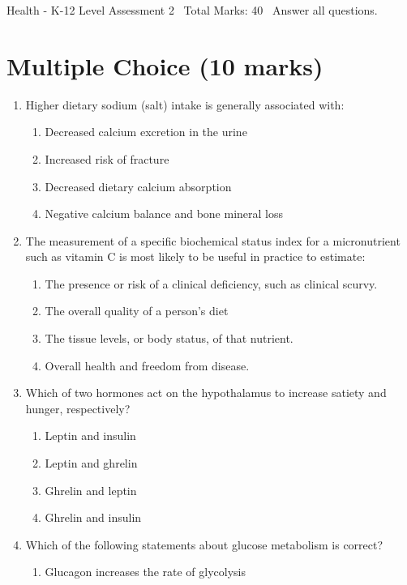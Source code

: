 \documentclass[12pt]{article}
\begin{document}
\begin{center}
Health - K-12 Level Assessment 2 \
Total Marks: 40 \
Answer all questions.
\end{center}

\section*{Multiple Choice (10 marks)}
\begin{enumerate}[label=\arabic*.]
\item Higher dietary sodium (salt) intake is generally associated with:
\begin{enumerate}[label=(\alph*)]
    \item Decreased calcium excretion in the urine
    \item Increased risk of fracture
    \item Decreased dietary calcium absorption
    \item Negative calcium balance and bone mineral loss
\end{enumerate}
\item The measurement of a specific biochemical status index for a micronutrient such as vitamin
C is most likely to be useful in practice to estimate:
\begin{enumerate}[label=(\alph*)]
    \item The presence or risk of a clinical deficiency, such as clinical scurvy.
    \item The overall quality of a person's diet
    \item The tissue levels, or body status, of that nutrient.
    \item Overall health and freedom from disease.
\end{enumerate}
\item Which of two hormones act on the hypothalamus to increase satiety and hunger,
respectively?
\begin{enumerate}[label=(\alph*)]
    \item Leptin and insulin
    \item Leptin and ghrelin
    \item Ghrelin and leptin
    \item Ghrelin and insulin
\end{enumerate}
\item Which of the following statements about glucose metabolism is correct?
\begin{enumerate}[label=(\alph*)]
    \item Glucagon increases the rate of glycolysis

\end{enumerate}
\end{enumerate}
\end{document}
